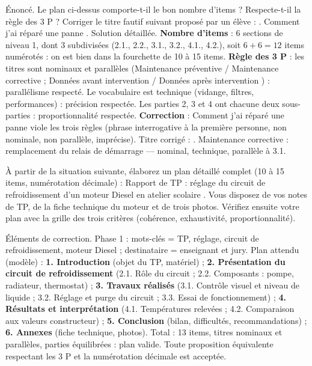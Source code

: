 \documentclass[11pt]{article}
\begin{document}
\begin{exoresolu}
Énoncé. Le plan ci-dessus comporte-t-il le bon nombre d'items ? Respecte-t-il la règle des 3 P ? Corriger le titre fautif suivant proposé par un élève : . Comment j'ai réparé une panne \fg{}.
\tcblower
Solution détaillée.
\textbf{Nombre d'items} : 6 sections de niveau 1, dont 3 subdivisées (2.1., 2.2., 3.1., 3.2., 4.1., 4.2.), soit $6 + 6 = 12$ items numérotés : on est bien dans la fourchette de 10 à 15 items.
\textbf{Règle des 3 P} : les titres sont nominaux et parallèles (\og Maintenance préventive \fg{} / \og Maintenance corrective \fg{} ; \og Données avant intervention \fg{} / \og Données après intervention \fg{}) : parallélisme respecté. Le vocabulaire est technique (vidange, filtres, performances) : précision respectée. Les parties 2, 3 et 4 ont chacune deux sous-parties : proportionnalité respectée.
\textbf{Correction} : \og Comment j'ai réparé une panne \fg{} viole les trois règles (phrase interrogative à la première personne, non nominale, non parallèle, imprécise). Titre corrigé : . Maintenance corrective : remplacement du relais de démarrage \fg{} — nominal, technique, parallèle à 3.1.
\end{exoresolu}

\begin{exercice}
À partir de la situation suivante, élaborez un plan détaillé complet (10 à 15 items, numérotation décimale) : \og Rapport de TP : réglage du circuit de refroidissement d'un moteur Diesel en atelier scolaire \fg{}. Vous disposez de vos notes de TP, de la fiche technique du moteur et de trois photos. Vérifiez ensuite votre plan avec la grille des trois critères (cohérence, exhaustivité, proportionnalité).
\end{exercice}

\begin{corrige}[Exercice 1]
Éléments de correction. Phase 1 : mots-clés = TP, réglage, circuit de refroidissement, moteur Diesel ; destinataire = enseignant et jury. Plan attendu (modèle) : \textbf{1. Introduction} (objet du TP, matériel) ; \textbf{2. Présentation du circuit de refroidissement} (2.1. Rôle du circuit ; 2.2. Composants : pompe, radiateur, thermostat) ; \textbf{3. Travaux réalisés} (3.1. Contrôle visuel et niveau de liquide ; 3.2. Réglage et purge du circuit ; 3.3. Essai de fonctionnement) ; \textbf{4. Résultats et interprétation} (4.1. Températures relevées ; 4.2. Comparaison aux valeurs constructeur) ; \textbf{5. Conclusion} (bilan, difficultés, recommandations) ; \textbf{6. Annexes} (fiche technique, photos). Total : 13 items, titres nominaux et parallèles, parties équilibrées : plan valide. Toute proposition équivalente respectant les 3 P et la numérotation décimale est acceptée.
\end{corrige}
\end{document}
